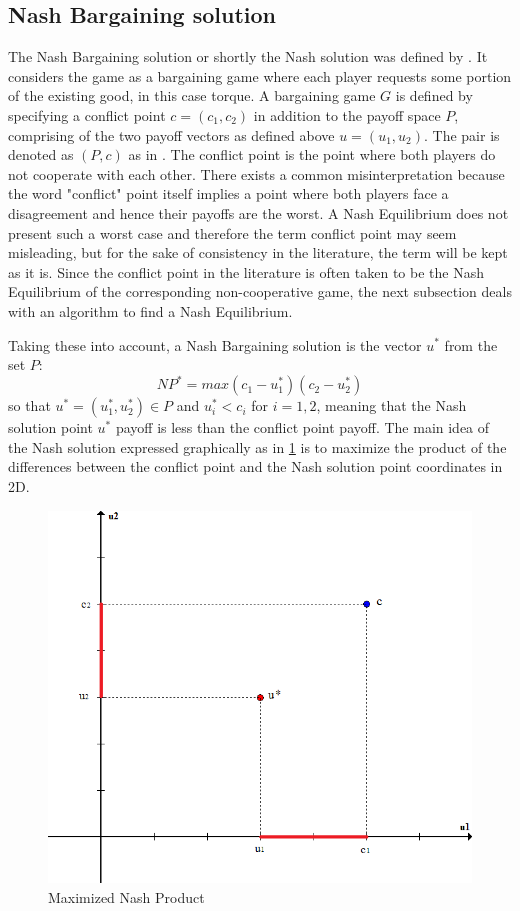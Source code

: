 \subsection{Nash Bargaining solution}
The Nash Bargaining solution or shortly the Nash solution was defined by \citet{nash1950bargaining}. It considers the game as a bargaining game where each player requests some portion of the existing good, in this case torque. A bargaining game $G$ is defined by specifying a conflict point $c = (c_1,c_2)$ in addition to the payoff space $P$, comprising of the two payoff vectors as defined above $u = (u_1,u_2)$. The pair is denoted as $(P,c)$ as in \citet{holler2006einfuhrung}. The conflict point is the point where both players do not cooperate with each other. There exists a common misinterpretation because the word "conflict" point itself implies a point where both players face a disagreement and hence their payoffs are the worst. A Nash Equilibrium does not present such a worst case and therefore the term conflict point may seem misleading, but for the sake of consistency in the literature, the term will be kept as it is. Since the conflict point in the literature is often taken to be the Nash Equilibrium of the corresponding non-cooperative game, the next subsection deals with an algorithm to find a Nash Equilibrium.

Taking these into account, a Nash Bargaining solution is the vector $u^*$ from the set $P$:
\[
NP^* = max(c_1 - u_1^* )(c_2 - u_2^*)
\]
so that $u^* = (u_1^*,u_2^*) \in P$ and $u_i^* < c_i$ for $i = 1,2$, meaning that the Nash solution point $u^*$ payoff is less than the conflict point payoff. The main idea of the Nash solution expressed graphically as in \ref{fig:nashSol} is to maximize the product of the differences between the conflict point and the Nash solution point coordinates in 2D.

\begin{figure}[h]
\centering
\includegraphics[scale=0.5]{figures/nashSolution}
\caption{Maximized Nash Product}
\label{fig:nashSol}
\end{figure}

